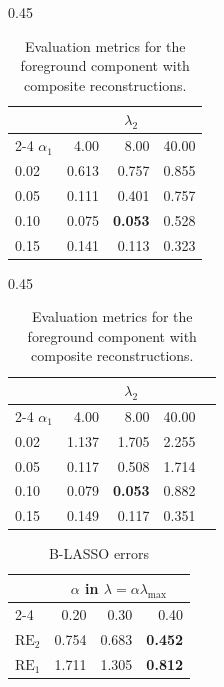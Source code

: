 \documentclass[12pt]{article}
\begin{document}
        \begin{table}[t]
        \centering
        \begin{subtable}[t]{0.45\linewidth}
            \centering
            \begin{tabular}{l|rrr}
                \toprule
                 & \multicolumn{3}{c}{$\lambda_2$} \\
                \cmidrule(lr){2-4}
                $\alpha_1$ & 4.00 & 8.00 & 40.00 \\
                \midrule
                0.02 & 0.613 & 0.757 & 0.855 \\
                0.05 & 0.111 & 0.401 & 0.757 \\
                0.10 & 0.075 & \textbf{0.053} & 0.528 \\
                0.15 & 0.141 & 0.113 & 0.323 \\
                \bottomrule
            \end{tabular}
            \caption{Relative $\ell_2$-norm error \label{tab:rl2}}
        \end{subtable}
        \hfill
        \begin{subtable}[t]{0.45\linewidth}
            \centering
            \begin{tabular}{l|rrrr}
                \toprule
                 & \multicolumn{3}{c}{$\lambda_2$} \\
                \cmidrule(lr){2-4}
                $\alpha_1$ & 4.00 & 8.00 & 40.00 \\
                \midrule
                0.02 & 1.137 & 1.705 & 2.255 \\
                0.05 & 0.117 & 0.508 & 1.714 \\
                0.10 & 0.079 & \textbf{0.053} & 0.882 \\
                0.15 & 0.149 & 0.117 & 0.351 \\
                \bottomrule
            \end{tabular}
            \caption{Relative $\ell_1$-norm error\label{tab:rl1}}
        \end{subtable}
        \caption{Evaluation metrics for the foreground component with composite reconstructions.}
        \end{table}
    
        \begin{table}[t]
            \centering
            \begin{tabular}{l|rrr}
                \toprule
                 & \multicolumn{3}{c}{$\alpha$ in $\lambda = \alpha \lambda_{\mathrm{max}}$} \\
                \cmidrule(lr){2-4}
                 & 0.20 & 0.30 & 0.40 \\
                \midrule
                $\mathrm{RE}_2$ & 0.754 & 0.683 & \textbf{0.452} \\
                $\mathrm{RE}_1$ & 1.711 & 1.305 & \textbf{0.812} \\
                \bottomrule
            \end{tabular}
            \caption{B-LASSO errors \label{tab:blasso}}
        \end{table}
\end{document}
